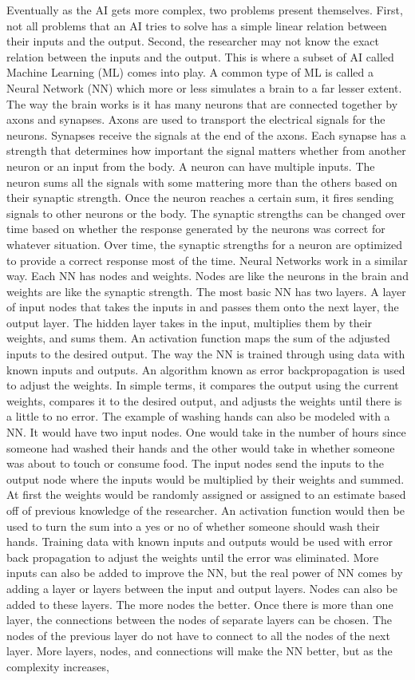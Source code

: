 \documentclass[]{article}
\begin{document}
		Eventually as the AI gets more complex, two problems present themselves.  First, not all problems that an AI tries to solve has a simple linear relation between their inputs and the output.  Second, the researcher may not know the exact relation between the inputs and the output.  This is where a subset of AI called Machine Learning (ML) comes into play.  A common type of  ML is called a Neural Network (NN) which more or less simulates a brain to a far lesser extent.  The way the brain works is it has many neurons that are connected together by axons and synapses. Axons are used to transport the electrical signals for the neurons. Synapses receive the signals at the end of the axons. Each synapse has a strength that determines how important the signal matters whether from another neuron or an input from the body. A neuron can have multiple inputs. The neuron sums all the signals with some mattering more than the others based on their synaptic strength. Once the neuron reaches a certain sum, it fires sending signals to other neurons or the body. The synaptic strengths can be changed over time based on whether the response generated by the neurons was correct for whatever situation. Over time, the synaptic strengths for a neuron are optimized to provide a correct response most of the time. Neural Networks work in a similar way. Each NN has nodes and weights. Nodes are like the neurons in the brain and weights are like the synaptic strength. The most basic NN has two layers. A layer of input nodes that takes the inputs in and passes them onto the next layer, the output layer. The hidden layer takes in the input, multiplies them by their weights, and sums them. An activation function maps the sum of the adjusted inputs to the desired output. The way the NN is trained through using data with known inputs and outputs. An algorithm known as error backpropagation is used to adjust the weights. In simple terms, it compares the output using the current weights, compares it to the desired output, and adjusts the weights until there is a little to no error. The example of washing hands can also be modeled with a NN. It would have two input nodes. One would take in the number of hours since someone had washed their hands and the other would take in whether someone was about to touch or consume food. The input nodes send the inputs to the output node where the inputs would be multiplied by their weights and summed. At first the weights would be randomly assigned or assigned to an estimate based off of previous knowledge of the researcher. An activation function would then be used to turn the sum into a yes or no of whether someone should wash their hands. Training data with known inputs and outputs would be used with error back propagation to adjust the weights until the error was eliminated. More inputs can also be added to improve the NN, but the real power of NN comes by adding a layer or layers between the input and output layers. Nodes can also be added to these layers. The more nodes the better. Once there is more than one layer, the connections between the nodes of separate layers can be chosen. The nodes of the previous layer do not have to connect to all the nodes of the next layer. More layers, nodes, and connections will make the NN better, but as the complexity increases, 
\end{document}
